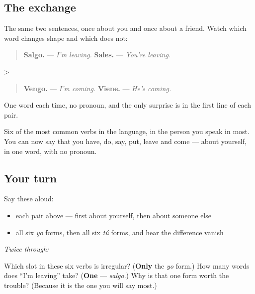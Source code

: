 \subsection*{The exchange}
The same two sentences, once about you and once about a friend. Watch which word changes shape and which does not:

\begin{quote}
\textbf{Salgo.} — \emph{I'm leaving.} \textbf{Sales.} — \emph{You're leaving.}
\end{quote}

>

\begin{quote}
\textbf{Vengo.} — \emph{I'm coming.} \textbf{Viene.} — \emph{He's coming.}
\end{quote}

One word each time, no pronoun, and the only surprise is in the first line of each pair.

\begin{grammarlens}[title={What you've built}]
Six of the most common verbs in the language, in the person you speak in most. You can now say that you have, do, say, put, leave and come — about yourself, in one word, with no pronoun.
\end{grammarlens}

\subsection*{Your turn}
Say these aloud:

\begin{itemize}
\raggedright
  \item each pair above — first about yourself, then about someone else
  \item all six \emph{yo} forms, then all six \emph{tú} forms, and hear the difference vanish
\end{itemize}

\emph{Twice through:}

\begin{tcolorbox}[breakable,colback=teal!4,colframe=teal!35!black,title={Before you move on}]
Which slot in these six verbs is irregular? (\textbf{Only} the \emph{yo} form.) How many words does \textquotedblleft{}I'm leaving\textquotedblright{} take? (\textbf{One} — \emph{salgo}.) Why is that one form worth the trouble? (Because it is the one you will say most.)
\end{tcolorbox}
